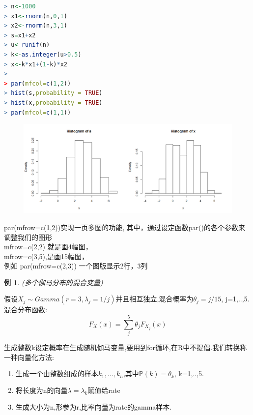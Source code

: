 \documentclass[11pt,a4paper,oneside]{book}
\newtheorem{example}{例}
\begin{document}
\begin{lstlisting}[language=r]
> n<-1000
> x1<-rnorm(n,0,1)
> x2<-rnorm(n,3,1)
> s=x1+x2
> u<-runif(n)
> k<-as.integer(u>0.5)
> x<-k*x1+(1-k)*x2
> 
> par(mfcol=c(1,2))
> hist(s,probability = TRUE)
> hist(x,probability = TRUE)
> par(mfcol=c(1,1))
\end{lstlisting}
\begin{figure}[H]
	\centering
	\includegraphics[width=\textwidth]{8.png}
\end{figure}
\begin{tcolorbox}[colback=pink!10!white,colframe=pink!100!black]
par(mfrow=c(1,2))实现一页多图的功能,
其中，通过设定函数par()的各个参数来调整我们的图形\\
mfrow=c(2,2) 就是画4幅图，\\
mfrow=c(3,5),是画15幅图，\\
例如 par(mfrow=c(2,3)) 一个图版显示2行，3列\\
\end{tcolorbox}

\begin{example}
(多个伽马分布的混合变量)
\end{example}
假设$ X_j\sim Gamma(r=3,\lambda_j=1/j) $并且相互独立,混合概率为$ \theta_j=j/15 $, j=1,..,5.混合分布函数:$$F_X(x)=\sum_j^5 \theta_jF_{X_j}(x) $$

生成整数k设定概率在生成随机伽马变量,要用到for循环,在R中不提倡.我们转换称一种向量化方法:
\begin{enumerate}
	\item 生成一个由整数组成的样本$ k_1,...,k_n $,其中$ \mathbb{P}(k)=\theta_k $, k=1,..,5.
	\item 将长度为n的向量$ \lambda=\lambda_k $赋值给rate
	\item 生成大小为n,形参为r,比率向量为rate的gamma样本.
\end{enumerate}
\end{document}
